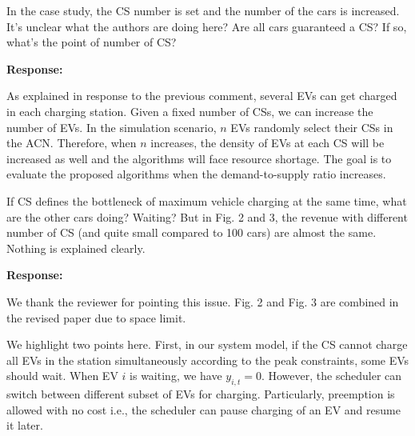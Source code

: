 \documentclass[11pt]{article}
\begin{document}

\vspace{3mm}
{\color{blue}In the case study, the CS number is set and the number of the cars is increased. It's unclear what the authors are doing here? Are all cars guaranteed a CS? If so, what's the point of number of CS? } 

\vspace{3mm}
\noindent\textbf{Response:}

As explained in response to the previous comment, several EVs can get charged in each charging station. Given a fixed number of CSs, we can increase the number of EVs. In the simulation scenario, $n$ EVs randomly select their CSs in the ACN. Therefore, when $n$ increases, the density of EVs at each CS will be increased as well and the algorithms will face resource shortage. The goal is to evaluate the proposed algorithms when the demand-to-supply ratio increases.

\vspace{3mm}
{\color{blue}If CS defines the bottleneck of maximum vehicle charging at the same time, what are the other cars doing? Waiting? But in Fig. 2 and 3, the revenue with different number of CS (and quite small compared to 100 cars) are almost the same. Nothing is explained clearly.}

\vspace{3mm}
\noindent\textbf{Response:}

We thank the reviewer for pointing this issue. Fig. 2 and Fig. 3 are combined in the revised paper due to space limit. 

We highlight two points here. First, in our system model, if the CS cannot charge all EVs in the station simultaneously according to the peak constraints, some EVs should wait. When EV $i$ is waiting, we have $y_{i,t}=0$. However, the scheduler can switch between different subset of EVs for charging. Particularly, preemption is allowed with no cost i.e., the scheduler can pause charging of an EV and resume it later.
\end{document}
